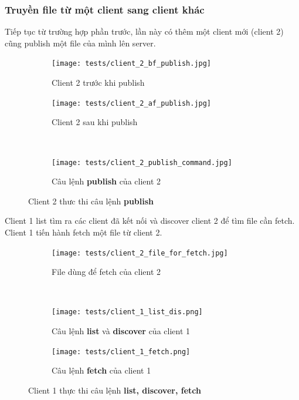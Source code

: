 \documentclass[a4paper]{article}
\begin{document}
	\subsubsection{Truyền file từ một client sang client khác}
	Tiếp tục từ trường hợp phần trước, lần này có thêm một client mới (client 2) cũng publish một file của mình lên server.
	\begin{figure}[h]
		\begin{center}
			\begin{subfigure}[b]{0.4\textwidth}
				\centering
				\texttt{[image: tests/client\_2\_bf\_publish.jpg]}
				\hspace{\textwidth}
				\caption{Client 2 trước khi publish}
			\end{subfigure}
			\begin{subfigure}[b]{0.4\textwidth}
				\centering
				\texttt{[image: tests/client\_2\_af\_publish.jpg]}
				\hspace{\textwidth}
				\caption{Client 2 sau khi publish}
			\end{subfigure}
			\\
			\begin{subfigure}[b]{0.8\textwidth}
				\centering
				\texttt{[image: tests/client\_2\_publish\_command.jpg]}
				\hspace{\textwidth}
				\caption{Câu lệnh \textbf{publish} của client 2}
			\end{subfigure}
			\caption{Client 2 thưc thi câu lệnh \textbf{publish}}
		\end{center}
	\end{figure}
	\newpage
	Client 1 list tìm ra các client đã kết nối và discover client 2 để tìm file cần fetch. Client 1 tiến hành fetch một file từ client 2.\\
	\begin{figure}[h]
		\begin{center}
			\begin{subfigure}[b]{0.8\textwidth}				
				\centering
				\texttt{[image: tests/client\_2\_file\_for\_fetch.jpg]}
				\hspace{\textwidth}
				\caption{File dùng để fetch của client 2}
			\end{subfigure}
			\\
			\begin{subfigure}[b]{0.4\textwidth}
				\centering
				\texttt{[image: tests/client\_1\_list\_dis.png]}
				\hspace{\textwidth}
				\caption{Câu lệnh \textbf{list} và \textbf{discover} của client 1}
			\end{subfigure}
			\begin{subfigure}[b]{0.4\textwidth}
				\centering
				\texttt{[image: tests/client\_1\_fetch.png]}
				\hspace{\textwidth}
				\caption{Câu lệnh \textbf{fetch} của client 1}
			\end{subfigure}
			\caption{Client 1 thực thi câu lệnh \textbf{list, discover, fetch}}
		\end{center}
	\end{figure}
\end{document}
